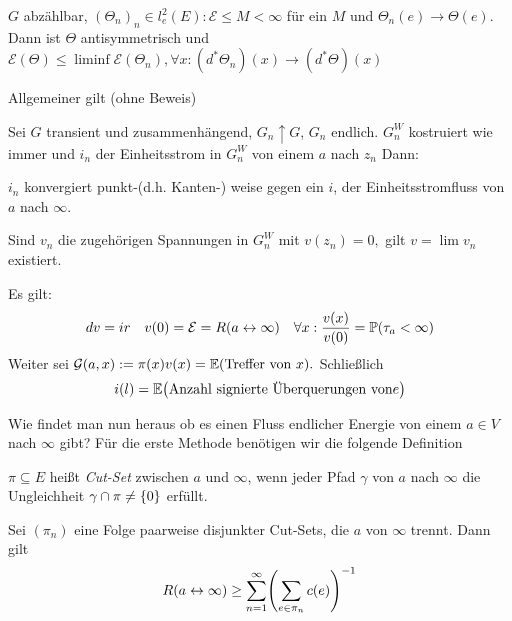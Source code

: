 \begin{uebung}
	$G$ abzählbar, $(\Theta_n)_n \in l^2_e(E): \mathcal{E} \leq M < \infty$ für ein $M$ und $\Theta_n(e) \to \Theta(e)$. Dann ist $\Theta$ antisymmetrisch und $\mathcal{E}(\Theta) \leq \liminf \mathcal{E}(\Theta_n), \forall x: (d^*\Theta_n)(x) \to (d^*\Theta)(x)$
\end{uebung}

Allgemeiner gilt (ohne Beweis)

	\begin{satz}
		Sei $G$ transient und zusammenhängend, $G_n \uparrow G$, $G_n$ endlich. $G_n^W$ kostruiert wie immer und $i_n$ der Einheitsstrom in $G^W_n$ von einem $a$ nach $z_n$ Dann:
		
		$i_n$ konvergiert punkt-(d.h. Kanten-) weise gegen ein $i$, der Einheitsstromfluss von $a$ nach $\infty$.

	Sind $v_n$ die zugehörigen Spannungen in $G^W_n$ mit $v(z_n) = 0,$ gilt $v  = \lim v_n$ existiert.

	Es gilt:
	\begin{align}
		dv = ir && v(0) = \mathcal{E} = R(a \leftrightarrow \infty) && \forall x: \frac{v(x)}{v(0)} = \prop{\tau_a < \infty}
	\end{align}
	Weiter sei $\mathcal{G}(a,x) := \pi(x)v(x) = \EW{\text{Treffer von }x}.$ Schließlich 
	\begin{equation}
		i(l) = \EW{\text{Anzahl signierte Überquerungen von}e} 
	\end{equation}

\end{satz}
Wie findet man nun heraus ob es einen Fluss endlicher Energie von einem $a\in V$ nach $\infty$ gibt? Für die erste Methode benötigen wir die folgende Definition
\begin{definition}
	$\pi \subseteq E$ heißt \emph{Cut-Set} zwischen $a$ und $\infty$, wenn jeder Pfad $\gamma$ von $a$ nach $\infty$ die Ungleichheit $\gamma \cap \pi \neq \{0\}$ erfüllt.
\end{definition}

\begin{satz}
	Sei $(\pi_n)$ eine Folge paarweise disjunkter Cut-Sets, die $a$ von $\infty$ trennt. Dann gilt 
	\begin{align}
		R(a \leftrightarrow \infty) \geq \sum\limits_{n = 1}^{\infty}\enb{\sum\limits_{e \in \pi_n} c(e)}^{-1}
	\end{align}
\end{satz}


